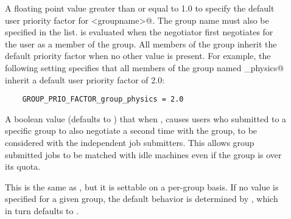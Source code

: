 \begin{description}

\item[] \label{param:GroupPrioFactorGroupname}
  A floating point value greater than or equal to 1.0 to specify the
  default user priority factor for \verb@<groupname>@. 
  The group name must also be specified in the  list.
   is evaluated when
  the negotiator first negotiates for the user as a member of the group.
  All members of the group inherit the default priority factor
  when no other value is present.
  For example, the following setting
  specifies that all members of the group named \verb@group_physics@
  inherit a default user priority factor of 2.0:
  \begin{verbatim}
    GROUP_PRIO_FACTOR_group_physics = 2.0
  \end{verbatim}

\item[] \label{param:GroupAutoregroup}
  A boolean value (defaults to ) that when ,
  causes users who submitted to a specific group to
  also negotiate a second time with the \verb@none@ group,
  to be considered with the independent job submitters. 
  This allows group submitted jobs to be matched with idle machines
  even if the group is over its quota.

\item[]
  This is the same as , but it is settable
  on a per-group basis.  If no value is specified for a given group,
  the default behavior is determined by ,
  which in turn defaults to .


\end{description}
